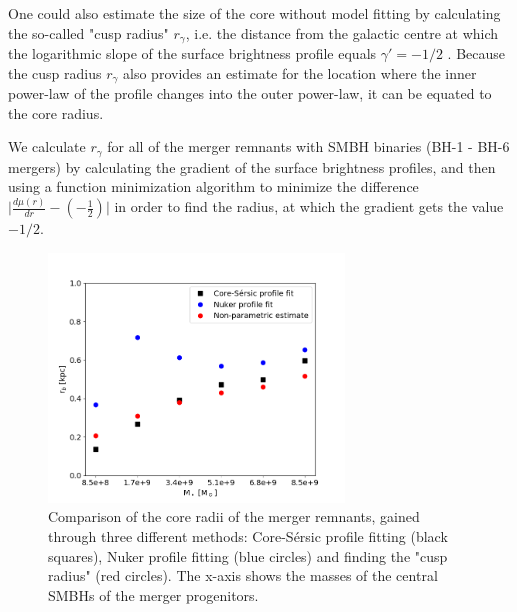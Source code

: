 \documentclass[english, oneside]{HYgradu}
\begin{document}
One could also estimate the size of the core without model fitting by calculating the so-called "cusp radius" $r_\gamma$, i.e. the distance from the galactic centre at which the logarithmic slope of the surface brightness profile equals $\gamma' = -1/2$ \citep{Carollo1997, Lauer2007Cusp}. Because the cusp radius $r_\gamma$ also provides an estimate for the location where the inner power-law of the profile changes into the outer power-law, it can be equated to the core radius. 

We calculate $r_\gamma$ for all of the merger remnants with SMBH binaries (BH-1 - BH-6 mergers) by calculating the gradient of the surface brightness profiles, and then using a function minimization algorithm \citep{NelderMead} to minimize the difference $\big| \frac{d\mu(r)}{dr} - \left( - \frac{1}{2} \right) \big|$ in order to find the radius, at which the gradient gets the value $-1/2$. 

\begin{figure}[h]
	\centering
	\includegraphics[width=0.7\textwidth]{rb_mass_relation.png}
	\caption{Comparison of the core radii of the merger remnants, gained through three different methods: Core-Sérsic profile fitting (black squares), Nuker profile fitting (blue circles) and  finding the "cusp radius" (red circles). The x-axis shows the masses of the central SMBHs of the merger progenitors.}
	\label{figure:radii_comparison}
\end{figure}
\end{document}
